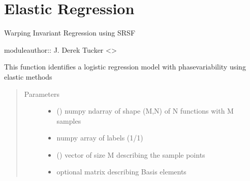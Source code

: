 \documentclass[letterpaper,10pt,english]{sphinxmanual}
\begin{document}
\chapter{Elastic Regression}
\label{\detokenize{regression:module-regression}}\label{\detokenize{regression:elastic-regression}}\label{\detokenize{regression::doc}}
Warping Invariant Regression using SRSF

moduleauthor:: J. Derek Tucker \textless{}\textgreater{}

\begin{fulllineitems}
\label{\detokenize{regression:regression.elastic_logistic}}
This function identifies a logistic regression model with
phase\sphinxhyphen{}variability using elastic methods
\begin{quote}\begin{description}
\item[{Parameters}] \leavevmode\begin{itemize}
\item {} 
 () \textendash{} numpy ndarray of shape (M,N) of N functions with M samples

\item {} 
 \textendash{} numpy array of labels (1/\sphinxhyphen{}1)

\item {} 
 () \textendash{} vector of size M describing the sample points

\item {} 
 \textendash{} optional matrix describing Basis elements


\end{itemize}
\end{description}
\end{quote}
\end{fulllineitems}
\end{document}
